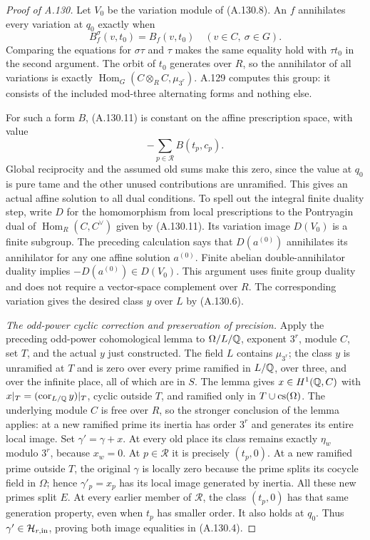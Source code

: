 \begin{proof}[Proof of A.130]
Let \(V_0\) be the variation module of (A.130.8).
An \(f\) annihilates every variation at \(q_0\)
exactly when
\[
           B_f^\sigma(v,t_0)=B_f(v,t_0)
                         \quad(v\in C,\ \sigma\in G).
 \tag{A.130.12}
\]
Comparing the equations for \(\sigma\tau\) and
\(\tau\) makes the same equality hold with
\(\tau t_0\) in the second argument.
The orbit of \(t_0\) generates over \(R\), so the
annihilator of all variations is exactly
\(\operatorname{Hom}_G(C\otimes_R C,\mu_{3^r})\).
A.129 computes this group: it consists of the
included mod-three alternating forms and nothing else.

For such a form \(B\), (A.130.11) is constant on
the affine prescription space, with value
\[
                         -\sum_{p\in\mathcal R}B(t_p,c_p).
 \tag{A.130.13}
\]
Global reciprocity and the assumed old sums make
this zero, since the value at \(q_0\) is pure tame
and the other unused contributions are unramified.
This gives an actual affine solution to all dual
conditions.  To spell out the integral finite
duality step, write \(D\) for the homomorphism from
local prescriptions to the Pontryagin dual of
\(\operatorname{Hom}_R(C,C^\vee)\) given by
(A.130.11).  Its variation image \(D(V_0)\) is a
finite subgroup.  The preceding calculation says
that \(D(a^{(0)})\) annihilates its annihilator
for any one affine solution \(a^{(0)}\).
Finite abelian double-annihilator duality implies
\(-D(a^{(0)})\in D(V_0)\).
This argument uses finite group duality and does
not require a vector-space complement over \(R\).
The corresponding variation gives the desired
class \(y\) over \(L\) by (A.130.6).

\emph{The odd-power cyclic correction and preservation of precision.}
Apply the preceding odd-power cohomological lemma
to \(\Omega/L/\mathbb Q\), exponent \(3^r\), module \(C\),
set \(T\), and the actual \(y\) just constructed.
The field \(L\) contains \(\mu_{3^r}\);
the class \(y\) is unramified at \(T\) and is zero
over every prime ramified in \(L/\mathbb Q\), over three,
and over the infinite place, all of which are in \(S\).
The lemma gives \(x\in H^1(\mathbb Q,C)\) with
\(x|_T=(\operatorname{cor}_{L/\mathbb Q}y)|_T\), cyclic
outside \(T\), and ramified only in
\(T\cup{\rm cs}(\Omega)\).
The underlying module \(C\) is free over \(R\), so the
stronger conclusion of the lemma applies: at a new ramified
prime its inertia has order \(3^r\) and generates its
entire local image.
Set \(\gamma'=\gamma+x\).
At every old place its class remains exactly
\(\eta_w\) modulo \(3^r\), because \(x_w=0\).
At \(p\in\mathcal R\) it is precisely \((t_p,0)\).
At a new ramified prime outside \(T\), the original
\(\gamma\) is locally zero because the prime
splits its cocycle field in \(\Omega\); hence
\(\gamma'_p=x_p\) has its local image generated by inertia.
All these new primes split \(E\).
At every earlier member of \(\mathcal R\), the class
\((t_p,0)\) has that same generation property, even when
\(t_p\) has smaller order.  It also holds at \(q_0\).
Thus \(\gamma'\in\mathcal H_{r,\rm in}\), proving both
image equalities in (A.130.4).


\end{proof}
